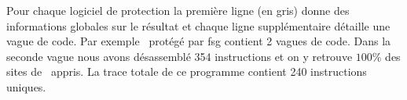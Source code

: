 Pour chaque logiciel de protection la première ligne (en gris) donne des informations globales sur le résultat et chaque ligne supplémentaire détaille une vague de code.
Par exemple \hostname\ protégé par fsg contient 2 vagues de code. Dans la seconde vague nous avons désassemblé 354 instructions et on y retrouve $100\%$ des sites de \hostname\ appris. La trace totale de ce programme contient 240 instructions uniques.

\begin{tiny}

\end{tiny}